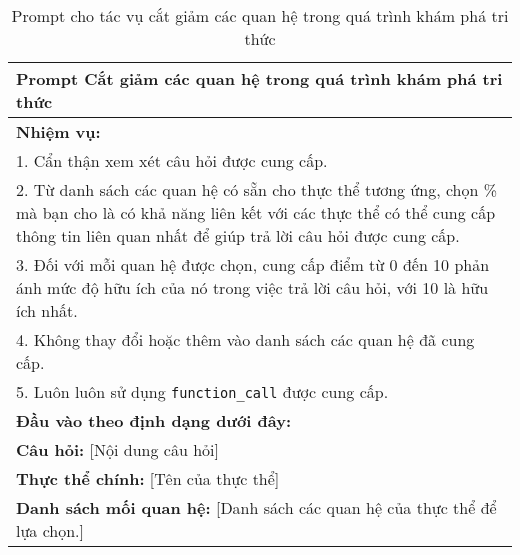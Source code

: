 \begin{table}[ht]
    \centering
    \caption{Prompt cho tác vụ cắt giảm các quan hệ trong quá trình khám phá tri thức}
    \label{tab:relation_prune_prompt}
    \small{\begin{tabular}{p{}}
            \toprule
            \textbf{Prompt Cắt giảm các quan hệ trong quá trình khám phá tri thức}                                                                                                                                 \\
            \midrule
            \textbf{Nhiệm vụ:}                                                                                                                                                                                     \\
            1. Cẩn thận xem xét câu hỏi được cung cấp.                                                                                                                                                             \\
            2. Từ danh sách các quan hệ có sẵn cho thực thể tương ứng, chọn \% mà bạn cho là có khả năng liên kết với các thực thể có thể cung cấp thông tin liên quan nhất để giúp trả lời câu hỏi được cung cấp. \\
            3. Đối với mỗi quan hệ được chọn, cung cấp điểm từ 0 đến 10 phản ánh mức độ hữu ích của nó trong việc trả lời câu hỏi, với 10 là hữu ích nhất.                                                         \\
            4. Không thay đổi hoặc thêm vào danh sách các quan hệ đã cung cấp.                                                                                                                                     \\
            5. Luôn luôn sử dụng \texttt{function\_call} được cung cấp.                                                                                                                                            \\
            \textbf{Đầu vào theo định dạng dưới đây:}                                                                                                                                                              \\
            \textbf{Câu hỏi:} [Nội dung câu hỏi]                                                                                                                                                                   \\
            \textbf{Thực thể chính:} [Tên của thực thể]                                                                                                                                                            \\
            \textbf{Danh sách mối quan hệ:} [Danh sách các quan hệ của thực thể để lựa chọn.]                                                                                                                      \\
            \bottomrule
        \end{tabular}}
\end{table}



